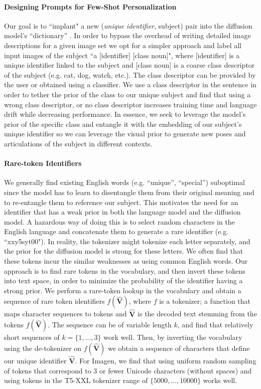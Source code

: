 \paragraph{Designing Prompts for Few-Shot Personalization} Our goal is to ``implant" a new (\textit{unique identifier}, subject) pair into the diffusion model's ``dictionary'' . In order to bypass the overhead of writing detailed image descriptions for a given image set we opt for a simpler approach and label all input images of the subject ``a [identifier] [class noun]", where [identifier] is a unique identifier linked to the subject and [class noun] is a coarse class descriptor of the subject (e.g. cat, dog, watch, etc.). The class descriptor can be provided by the user or obtained using a classifier. We use a class descriptor in the sentence in order to tether the prior of the class to our unique subject and find that using a wrong class descriptor, or no class descriptor increases training time and language drift while decreasing performance. In essence, we seek to leverage the model's prior of the specific class and entangle it with the embedding of our subject's unique identifier so we can leverage the visual prior to generate new poses and articulations of the subject in different contexts.

\paragraph{Rare-token Identifiers} We generally find existing English words (e.g. ``unique'', ``special'') suboptimal since the model has to learn to disentangle them from their original meaning and to re-entangle them to reference our subject. This motivates the need for an identifier that has a weak prior in both the language model and the diffusion model. A hazardous way of doing this is to select random characters in the English language and concatenate them to generate a rare identifier (e.g. ``xxy5syt00"). In reality, the tokenizer might tokenize each letter separately, and the prior for the diffusion model is strong for these letters. We often find that these tokens incur the similar weaknesses as using common English words. Our approach is to find rare tokens in the vocabulary, and then invert these tokens into text space, in order to minimize the probability of the identifier having a strong prior. We perform a rare-token lookup in the vocabulary and obtain a sequence of rare token identifiers $f(\hat{\mathbf{V}})$, where $f$ is a tokenizer; a function that maps character sequences to tokens and $\hat{\mathbf{V}}$ is the decoded text stemming from the tokens $f(\hat{\mathbf{V}})$. The sequence can be of variable length $k$, and find that relatively short sequences of $k=\{1, ..., 3\}$ work well. Then, by inverting the vocabulary using the de-tokenizer on $f(\hat{\mathbf{V}})$ we obtain a sequence of characters that define our unique identifier $\hat{\mathbf{V}}$. For Imagen, we find that using uniform random sampling of tokens that correspond to 3 or fewer Unicode characters (without spaces) and using tokens in the T5-XXL tokenizer range of $\{5000, ..., 10000\}$ works well.

